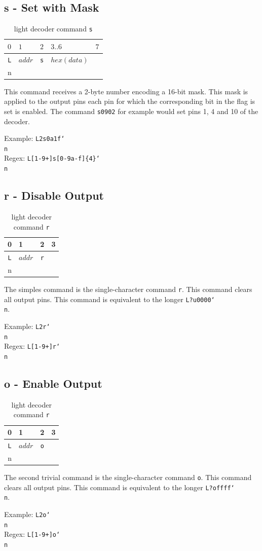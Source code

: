 \documentclass{scrreprt}
\newcommand\n{\char`\\n}
\begin{document}
\pagebreak
\subsection{s - Set with Mask}
\begin{table}[ht!]
\centering
\begin{tabular}{ |c|c||c|c||c| } 
\multicolumn{1}{l}{$0$} & \multicolumn{1}{l}{$1$} & \multicolumn{1}{l}{$2$} & \multicolumn{1}{l}{$3..6$} & \multicolumn{1}{l}{$7$} \\ \hline
\texttt{L} & $addr$ & \texttt{s} & $hex(data)$ & \texttt{\n} \\\hline
\end{tabular}
\caption{light decoder command \texttt{s}}
\end{table}

This command receives a 2-byte number encoding a 16-bit mask.
This mask is applied to the output pins each pin for which the corresponding bit in the flag is set is enabled. The command \texttt{s0902} for example would set pins 1, 4 and 10 of the decoder.

Example: \texttt{L2s0a1f\n} \\
Regex: \texttt{L[1-9+]s[0-9a-f]\{4\}\n}

\subsection{r - Disable Output}
\begin{table}[ht!]
\centering
\begin{tabular}{ |c|c||c||c| } 
\multicolumn{1}{l}{0} & \multicolumn{1}{l}{1} & \multicolumn{1}{l}{2} & \multicolumn{1}{l}{3} \\ \hline
\texttt{L} & $addr$ & \texttt{r} & \texttt{\n} \\\hline
\end{tabular}
\caption{light decoder command \texttt{r}}
\end{table}

The simples command is the single-character command \texttt{r}.
This command clears all output pins.
This command is equivalent to the longer \texttt{L?u0000\n}.

Example: \texttt{L2r\n}\\
Regex: \texttt{L[1-9+]r\n}

\subsection{o - Enable Output}
\begin{table}[ht!]
\centering
\begin{tabular}{ |c|c||c||c| } 
\multicolumn{1}{l}{0} & \multicolumn{1}{l}{1} & \multicolumn{1}{l}{2} & \multicolumn{1}{l}{3} \\ \hline
\texttt{L} & $addr$ & \texttt{o} & \texttt{\n} \\\hline
\end{tabular}
\caption{light decoder command \texttt{r}}
\end{table}

The second trivial command is the single-character command \texttt{o}.
This command clears all output pins.
This command is equivalent to the longer \texttt{L?offff\n}.

Example: \texttt{L2o\n}\\
Regex: \texttt{L[1-9+]o\n}
\end{document}
